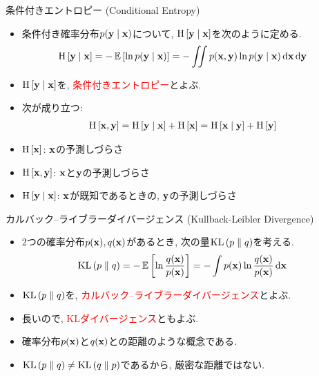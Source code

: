 \documentclass[dvipdfmx,notheorems,t]{beamer}
\begin{document}
\begin{frame}{条件付きエントロピー (Conditional Entropy)}
\begin{itemize}
  \item 条件付き確率分布$p(\vb{y} \mid \vb{x})$について, $\operatorname{H} \left[ \vb{y} \mid \vb{x} \right]$を次のように定める.
  \begin{align*}
    \operatorname{H} \left[ \vb{y} \mid \vb{x} \right] &= -\operatorname{\mathbb{E}} \left[ \ln p(\vb{y} \mid \vb{x}) \right]
      = - \iint p(\vb{x}, \vb{y}) \ln p(\vb{y} \mid \vb{x}) \dd{\vb{x}} \dd{\vb{y}}
  \end{align*}
  \item $\operatorname{H} \left[ \vb{y} \mid \vb{x} \right]$を, \textcolor{red}{条件付きエントロピー}とよぶ.
  \item 次が成り立つ:
  \begin{align*}
    \operatorname{H} \left[ \vb{x}, \vb{y} \right] &= \operatorname{H} \left[ \vb{y} \mid \vb{x} \right] + \operatorname{H} \left[ \vb{x} \right]
      = \operatorname{H} \left[ \vb{x} \mid \vb{y} \right] + \operatorname{H} \left[ \vb{y} \right]
  \end{align*}
  \item $\operatorname{H} \left[ \vb{x} \right]$: $\vb{x}$の予測しづらさ
  \item $\operatorname{H} \left[ \vb{x}, \vb{y} \right]$: $\vb{x}$と$\vb{y}$の予測しづらさ
  \item $\operatorname{H} \left[ \vb{y} \mid \vb{x} \right]$: $\vb{x}$が既知であるときの, $\vb{y}$の予測しづらさ
\end{itemize}
\end{frame}

\begin{frame}{カルバック--ライブラーダイバージェンス (Kullback-Leibler Divergence)}
\begin{itemize}
  \item 2つの確率分布$p(\vb{x}), q(\vb{x})$があるとき, 次の量$\operatorname{KL} \left( p \parallel q \right)$を考える.
  \begin{align*}
    \operatorname{KL} \left( p \parallel q \right) &= -\operatorname{\mathbb{E}} \left[ \ln \frac{q(\vb{x})}{p(\vb{x})} \right]
      = -\int p(\vb{x}) \ln \frac{q(\vb{x})}{p(\vb{x})} \dd{\vb{x}}
  \end{align*}
  \item $\operatorname{KL} \left( p \parallel q \right)$を, \textcolor{red}{カルバック--ライブラーダイバージェンス}とよぶ.
  \item 長いので, \textcolor{red}{KLダイバージェンス}ともよぶ.
  \item 確率分布$p(\vb{x})$と$q(\vb{x})$との距離のような概念である.
  \item $\operatorname{KL} \left( p \parallel q \right) \neq \operatorname{KL} \left( q \parallel p \right)$であるから, 厳密な距離ではない.
\end{itemize}
\end{frame}
\end{document}
